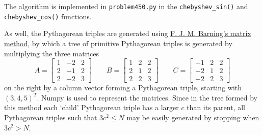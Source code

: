 \documentclass[12pt]{article}
\begin{document}
The algorithm is implemented in \texttt{problem450.py} in the \texttt{chebyshev\_sin()} and \texttt{chebyshev\_cos()} functions.

As well, the Pythagorean triples are generated using \href{https://en.wikipedia.org/wiki/Tree_of_primitive_Pythagorean_triples}{F. J. M. Barning's matrix method}, by which a tree of primitive Pythagorean triples is generated by multiplying the three matrices
\begin{equation*}
  A =
  \begin{bmatrix}
    1 & -2 & 2 \\
    2 & -1 & 2 \\
    2 & -2 & 3
  \end{bmatrix}
  \qquad B =
  \begin{bmatrix}
    1 & 2 & 2 \\
    2 & 1 & 2 \\
    2 & 2 & 3
  \end{bmatrix}
  \qquad C =
  \begin{bmatrix}
    -1 & 2 & 2 \\
    -2 & 1 & 2 \\
    -2 & 2 & 3
  \end{bmatrix}
\end{equation*}
on the right by a column vector forming a Pythagorean triple, starting with $(3, 4, 5)^T$. Numpy is used to represent the matrices. Since in the tree formed by this method each `child' Pythagorean triple has a larger $c$ than its parent, all Pythagorean triples such that $3c^2 \le N$ may be easily generated by stopping when $3c^2 > N$.
\end{document}
